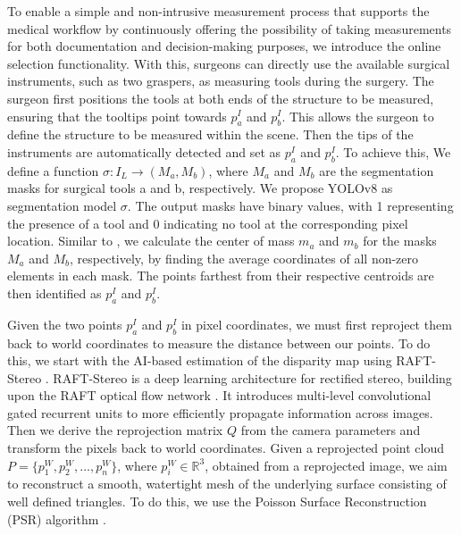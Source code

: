 \documentclass[letterpaper]{article} %
\begin{document}
To enable a simple and non-intrusive measurement process that supports the medical workflow by continuously offering the possibility of taking measurements for both documentation and decision-making purposes, we introduce the online selection functionality. With this, surgeons can directly use the available surgical instruments, such as two graspers, as measuring tools during the surgery. The surgeon first positions the tools at both ends of the structure to be measured, ensuring that the tooltips point towards $p_a^{I}$ and $p_b^{I}$. This allows the surgeon to define the structure to be measured within the scene. Then the tips of the instruments are automatically detected and set as $p_a^{I}$ and $p_b^{I}$. To achieve this, We define a function $\sigma: I_L \rightarrow (M_a, M_b)$, where $M_a$ and $M_b$ are the segmentation masks for surgical tools a and b, respectively. We propose YOLOv8 \cite{jocher_yolov8_2023} as segmentation model $\sigma$. The output masks have binary values, with 1 representing the presence of a tool and 0 indicating no tool at the corresponding pixel location. Similar to \citet{bodenstedt_image-based_2016}, we calculate the center of mass $m_a$ and $m_b$ for the masks $M_a$ and $M_b$, respectively, by finding the average coordinates of all non-zero elements in each mask. The points farthest from their respective centroids are then identified as $p_a^{I}$ and $p_b^{I}$.
 
Given the two points $p_a^{I}$ and $p_b^{I}$ in pixel coordinates, we must first reproject them back to world coordinates to measure the distance between our points. To do this, we start with the AI-based estimation of the disparity map using RAFT-Stereo \cite{lipson_raft-stereo_2021}. RAFT-Stereo is a deep learning architecture for rectified stereo, building upon the RAFT optical flow network \cite{Teed2020}. It introduces multi-level convolutional gated recurrent units to more efficiently propagate information across images. Then we derive the reprojection matrix $Q$ from the camera parameters and transform the pixels back to world coordinates. Given a reprojected point cloud $P = \{p_1^{W}, p_2^{W}, \ldots, p_n^{W}\}$, where $p_i^{W} \in \mathbb{R}^3$, obtained from a reprojected image, we aim to reconstruct a smooth, watertight mesh of the underlying surface consisting of well defined triangles. To do this, we use the Poisson Surface Reconstruction (PSR) algorithm \cite{kazhdan_poisson_2006}.
\end{document}
